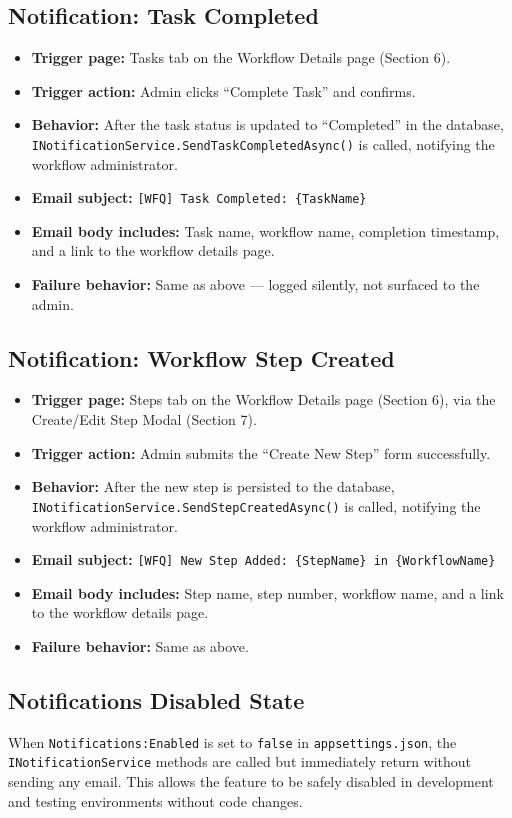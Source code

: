 \documentclass[12pt]{article}
\begin{document}
\subsection{Notification: Task Completed}
\begin{itemize}
    \item \textbf{Trigger page:} Tasks tab on the Workflow Details page (Section 6).
    \item \textbf{Trigger action:} Admin clicks ``Complete Task'' and confirms.
    \item \textbf{Behavior:} After the task status is updated to ``Completed'' in the
    database, \texttt{INotificationService.SendTaskCompletedAsync()} is called, notifying
    the workflow administrator.
    \item \textbf{Email subject:} \texttt{[WFQ] Task Completed: \{TaskName\}}
    \item \textbf{Email body includes:} Task name, workflow name, completion timestamp, and
    a link to the workflow details page.
    \item \textbf{Failure behavior:} Same as above --- logged silently, not surfaced to the
    admin.
\end{itemize}

\subsection{Notification: Workflow Step Created}
\begin{itemize}
    \item \textbf{Trigger page:} Steps tab on the Workflow Details page (Section 6), via
    the Create/Edit Step Modal (Section 7).
    \item \textbf{Trigger action:} Admin submits the ``Create New Step'' form successfully.
    \item \textbf{Behavior:} After the new step is persisted to the database,
    \texttt{INotificationService.SendStepCreatedAsync()} is called, notifying the workflow
    administrator.
    \item \textbf{Email subject:} \texttt{[WFQ] New Step Added: \{StepName\} in
    \{WorkflowName\}}
    \item \textbf{Email body includes:} Step name, step number, workflow name, and a link
    to the workflow details page.
    \item \textbf{Failure behavior:} Same as above.
\end{itemize}

\subsection{Notifications Disabled State}
When \texttt{Notifications:Enabled} is set to \texttt{false} in
\texttt{appsettings.json}, the \texttt{INotificationService} methods are called but
immediately return without sending any email. This allows the feature to be safely disabled
in development and testing environments without code changes.
\end{document}
